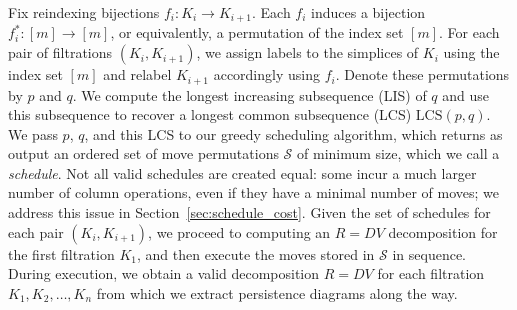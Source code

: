 \documentclass{article} %
\begin{document}
Fix reindexing  bijections $f_i : K_i \to K_{i+1}$. 
Each $f_i$ induces a bijection $f_i^\ast : [m] \to [m]$, or equivalently, a permutation of the index set $[m]$. For each pair of filtrations $(K_i, K_{i+1})$, we assign labels to the simplices of $K_i$ using the index set $[m]$ and relabel $K_{i+1}$ accordingly using $f_i$. Denote these permutations by $p$ and $q$. 
We compute the longest increasing subsequence (LIS) of $q$ and use this subsequence to recover a longest common subsequence (LCS) $\mathrm{LCS}(p,q)$. We pass $p$, $q$, and this LCS to our greedy scheduling algorithm, which returns as output an ordered set of move permutations  $\mathcal{S}$ of minimum size, which we call a \emph{schedule}.
Not all valid schedules are created equal: some incur a much larger number of column operations, even if they have a minimal number of moves; we address this issue in Section~\ref{sec:schedule_cost}.
Given the set of schedules for each pair $(K_i, K_{i+1})$, we proceed to computing an $R=DV$ decomposition for the first filtration $K_1$, and then execute the moves stored in $\mathcal{S}$ in sequence. During execution, we obtain a valid decomposition $R = DV$ for each filtration $K_1, K_2, \dots, K_n$ from which we extract persistence diagrams along the way. 
\end{document}
